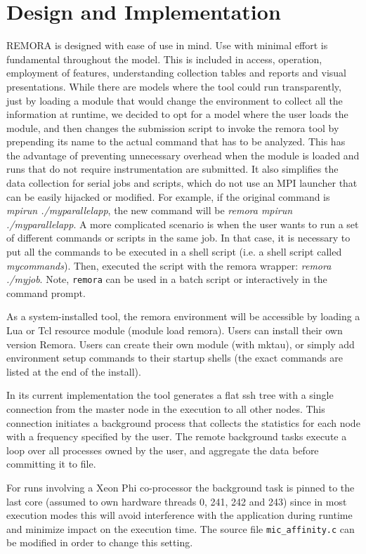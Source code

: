 \documentclass[10pt,a4paper]{report}
\begin{document}
\chapter{Design and Implementation}
REMORA is designed with ease of use in mind. 
Use with minimal effort is fundamental throughout the model.
This is included in access, operation, employment of features, understanding collection tables and reports and visual presentations.
While there are models where the tool could run transparently, 
just by loading a module that would change the environment to collect all the information at runtime, 
we decided to opt for a model where the user loads the module, and then changes the submission script 
to invoke the remora tool by prepending its name to the actual command that has to be analyzed. 
This has the advantage of preventing unnecessary overhead when the module is loaded and runs 
that do not require instrumentation are submitted. 
It also simplifies the data collection for serial jobs and scripts, which do not use an MPI launcher 
that can be easily hijacked or modified. For example, if the original command is \textit{mpirun ./myparallelapp}, 
the new command will be \textit{remora mpirun ./myparallelapp}. 
A more complicated scenario is when the user wants to run a set of different commands or scripts in the same job. 
In that case, it is necessary to put all the commands to be executed in a shell script 
(i.e. a shell script called \textit{mycommands}). 
Then, executed the script with the remora wrapper: \textit{remora ./myjob}. 
Note, \verb+remora+ can be used in a batch script or interactively in the command prompt.

As a system-installed tool, the remora environment will be accessible by loading a Lua or Tcl resource module
(module load remora). Users can install their own version Remora.  
Users can create their own module (with mktau), or simply add environment setup commands to their startup shells
(the exact commands are listed at the end of the install).

In its current implementation the tool generates a flat ssh tree with a single connection from the master node in the execution to all other nodes. This connection initiates a background process that collects the statistics for each node with a frequency specified by the user. The remote background tasks execute a loop over all processes owned by the user, and aggregate the data before committing it to file.

For runs involving a Xeon Phi co-processor the background task is pinned to the last core (assumed to own hardware threads 0, 241, 242 and 243) since in most execution modes this will avoid interference with the application during runtime and minimize impact on the execution time. The source file \texttt{mic\_affinity.c} can be modified in order to change this setting.
\end{document}

